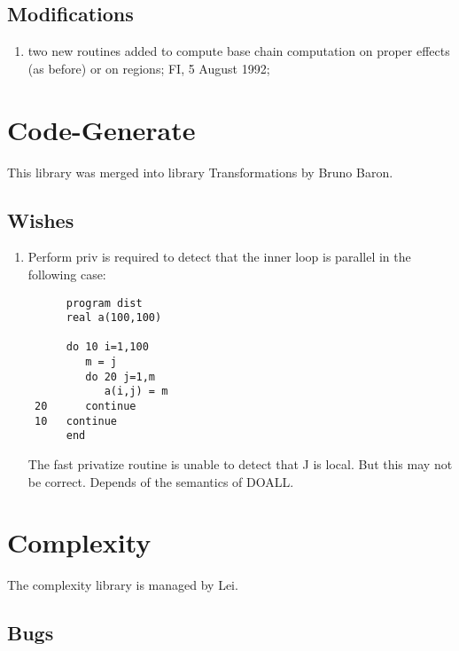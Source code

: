 \subsection{Modifications}

\begin{enumerate}

  \item two new routines added to compute base chain computation on
	proper effects (as before) or on regions; FI, 5 August 1992;

\end{enumerate}

\section{Code-Generate}

This library was merged into library Transformations by Bruno Baron.

\subsection{Wishes}

\begin{enumerate}

  \item Perform priv is required to detect that the inner loop is
parallel in the following case:
\begin{verbatim}
      program dist
      real a(100,100)

      do 10 i=1,100
         m = j
         do 20 j=1,m
            a(i,j) = m
 20      continue
 10   continue
      end
\end{verbatim}
The fast privatize routine is unable to detect that J is local.  But
this may not be correct. Depends of the semantics of DOALL.
      
\end{enumerate}

\section{Complexity}

The complexity library is managed by Lei.

\subsection{Bugs}


